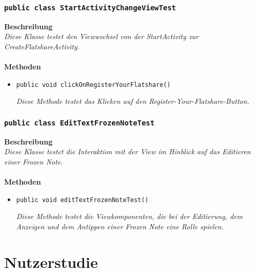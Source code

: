 \documentclass[a4paper]{scrreprt}
\begin{document}
	\subsection{\texttt{public class StartActivityChangeViewTest}}
	\textbf{Beschreibung}\\
	\textit{Diese Klasse testet den Viewwechsel von der StartActivity zur CreateFlatshareActivity.}\\
	\\
	\textbf{Methoden}
	\begin{itemize}
		
		\item\texttt{{public void clickOnRegisterYourFlatshare()}}
		
		\textit{Diese Methode testet das Klicken auf den Register-Your-Flatshare-Button.}
		
	\end{itemize}
	\subsection{\texttt{public class EditTextFrozenNoteTest}}
	\textbf{Beschreibung}\\
	\textit{Diese Klasse testet die Interaktion mit der View im Hinblick auf das Editieren einer Frozen Note.}\\
	\\
	\textbf{Methoden}
	\begin{itemize}
		
		\item\texttt{{public void editTextFrozenNoteTest()}}
		
		\textit{Diese Methode testet die Viewkomponenten, die bei der Editierung, dem Anzeigen und dem Antippen einer Frozen Note eine Rolle spielen.}
		
	\end{itemize}
	\chapter{Nutzerstudie}
	
\end{document}
